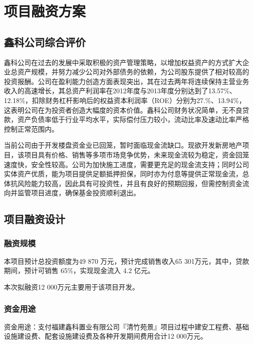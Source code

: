 
\chapter{项目融资方案} 
\label{chap04}

\section{鑫科公司综合评价}
鑫科公司在过去的发展中采取积极的资产管理策略，以增加权益资产的方式扩大企业总资产规模，并努力减少公司对外部债务的依赖，为公司股东提供了相对较高的投资报酬。公司在盈利能力创造方面表现突出，其在过去两年将连续保持主营业务收入的高速增长，其总资产利润率在2012年度与2013年度分别达到了13.57\%、12.18\%，扣除财务杠杆影响后的权益资本利润率（ROE）分别为27.\%、13.94\%，这表明公司在为投资者创造大幅度的资本价值。鑫科公司财务状况简单，无不良贷款，资产负债率低于行业平均水平，实际偿付压力较小，流动比率及速动比率严格控制正常范围内。

当前公司由于开发楼盘资金业已回笼，暂时面临现金流缺口。现欲开发新房地产项目，该项目具有价格、销售等多项市场竞争优势，未来现金流较为稳定，资金回笼速度快，安全性较高。公司为加快施工进度，需要更充足的现金流支持；同时公司实体资产优质，能为项目提供足额抵押担保，同时亦为付息等提供正常现金流，总体抗风险能力较高，因此具有可投资性，并且有良好的预期回报，但需控制资金流向并监管项目进度，确保基金投资顺利退出。

\section{项目融资设计}
\subsection{融资规模}
本项目预计总投资额度为49 870 万元，预计完成销售收入65 301万元，其中，贷款期间，预计可销售 65\%，实现现金流入 4.2 亿元。

本次拟融资12 000万元主要用于该项目开发。

\subsection{资金用途}
资金用途：支付福建鑫科置业有限公司『清竹苑景』项目过程中建安工程费、基础设施建设费、配套设施建设费及各种开发期间费用合计12 000万元。

